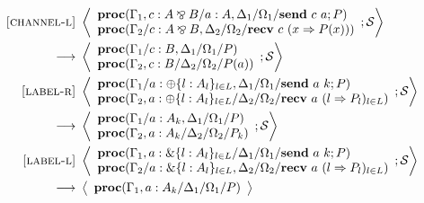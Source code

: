 \documentclass[12pt, openany]{memoir}
\newcommand*{\pare}[0]{\mathbin{\bindnasrepma}}
\newcommand*{\send}[2]{\textbf{send}\ #1\ #2}
\newcommand*{\recv}[2]{\textbf{recv}\ #1\ #2}
\newcommand*{\procObj}[4]{\textbf{proc}(#1/#2/#3/#4)}
\newcommand*{\cancelSet}[0]{\mathcal{S}}
\begin{document}
\begin{figure}[H]
\begin{alignat}{2}
{    } \tag*{} \\
    \label{channel-reduction-l} \textsc{[channel-l]} & ~ 
      \Braket{
        \begin{array}{l}
          \procObj{\Gamma_1, c : A \pare B}{a : A, \Delta_1}{\Omega_1}{\send{c}{a}; P} \\
          \procObj{\Gamma_2}{c : A \pare B, \Delta_2}{\Omega_2}{\recv{c}{(x \Rightarrow P(x))}}
        \end{array}
        ; \cancelSet
      } \tag*{} \\ ~ \longrightarrow & ~ 
      \Braket{
        \begin{array}{l}
          \procObj{\Gamma_1}{c : B, \Delta_1}{\Omega_1}{P} \\
          \procObj{\Gamma_2, c : B}{\Delta_2}{\Omega_2}{P(a)}
        \end{array}
        ; \cancelSet
    } \tag*{} \\
    \label{label-reduction-r} \textsc{[label-r]} & ~ 
      \Braket{
        \begin{array}{l}
          \procObj{\Gamma_1}{a : \oplus\{l : A_l\}_{l \in L}, \Delta_1}{\Omega_1}{\send{a}{k}; P} \\
          \procObj{\Gamma_2, a : \oplus\{l : A_l\}_{l \in L}}{\Delta_2}{\Omega_2}{\recv{a}{(l \Rightarrow P_l)_{l \in L}}}
        \end{array}
        ; \cancelSet
      } \tag*{} \\ ~ \longrightarrow & ~ 
      \Braket{
        \begin{array}{l}
          \procObj{\Gamma_1}{a : A_k, \Delta_1}{\Omega_1}{P} \\
          \procObj{\Gamma_2, a : A_k}{\Delta_2}{\Omega_2}{P_k}
        \end{array}
        ; \cancelSet
    } \tag*{} \\
    \label{label-reduction-l} \textsc{[label-l]} & ~ 
      \Braket{
        \begin{array}{l}
          \procObj{\Gamma_1, a : \&\{l : A_l\}_{l \in L}}{\Delta_1}{\Omega_1}{\send{a}{k}; P} \\
          \procObj{\Gamma_2}{a : \&\{l : A_l\}_{l \in L}, \Delta_2}{\Omega_2}{\recv{a}{(l \Rightarrow P_l)_{l \in L}}}
        \end{array}
        ; \cancelSet
      } \tag*{} \\ ~ \longrightarrow & ~ 
      \Braket{
        \begin{array}{l}
          \procObj{\Gamma_1, a : A_k}{\Delta_1}{\Omega_1}{P} \\

\end{array}}
\end{alignat}
\end{figure}
\end{document}
